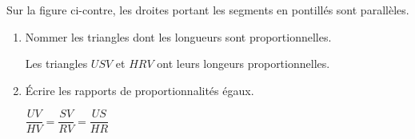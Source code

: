 \begin{corrige}
    \phantom{rrr}

    \begin{minipage}{0.3\linewidth}
    \end{minipage}
    \begin{minipage}{0.6\linewidth}
         Sur la figure ci-contre, les droites portant les segments en pontillés sont parallèles.

        \begin{enumerate}
            \item Nommer les triangles dont les longueurs sont proportionnelles.
            
            {\color{red} Les triangles $USV$ et $HRV$ ont leurs longeurs proportionnelles.}
            \item Écrire les rapports de proportionnalités égaux.
            
            \smallskip
            {\color{red} $\dfrac{UV}{HV} = \dfrac{SV}{RV} = \dfrac{US}{HR}$}
        \end{enumerate}
    \end{minipage}

\end{corrige}


